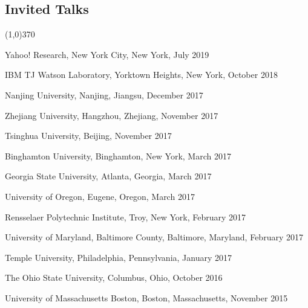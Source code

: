 \documentclass[10pt]{article}
\newenvironment{myindentpar}[1]%
{\begin{list}{}%
         {\setlength{\leftmargin}{#1}}%
         \item[]%
}
{\end{list}}
\newcounter{list}
\begin{document}
\subsection{\sc Invited Talks}
\vspace{-0.4cm} \line(1,0){370} \vspace{-0.1cm}

\begin{myindentpar}{0.75cm}

\hspace{-0.75cm} Yahoo! Research, New York City, New York, July 2019

\hspace{-0.75cm} IBM TJ Watson Laboratory, Yorktown Heights, New York, October 2018
	
\hspace{-0.75cm} Nanjing University, Nanjing, Jiangsu, December 2017


\hspace{-0.75cm} Zhejiang University, Hangzhou, Zhejiang, November 2017

\hspace{-0.75cm} Tsinghua University, Beijing, November 2017

\hspace{-0.75cm} Binghamton University, Binghamton, New York, March 2017

\hspace{-0.75cm} Georgia State University, Atlanta, Georgia, March 2017

\hspace{-0.75cm} University of Oregon, Eugene, Oregon, March 2017

\hspace{-0.75cm} Rensselaer Polytechnic Institute, Troy, New York, February 2017

\hspace{-0.75cm} University of Maryland, Baltimore County, Baltimore, Maryland, February 2017

\hspace{-0.75cm} Temple University, Philadelphia, Pennsylvania, January 2017

\hspace{-0.75cm} The Ohio State University, Columbus, Ohio, October 2016

\hspace{-0.75cm} University of Massachusetts Boston, Boston, Massachusetts, November 2015

\end{myindentpar}
\end{document}
